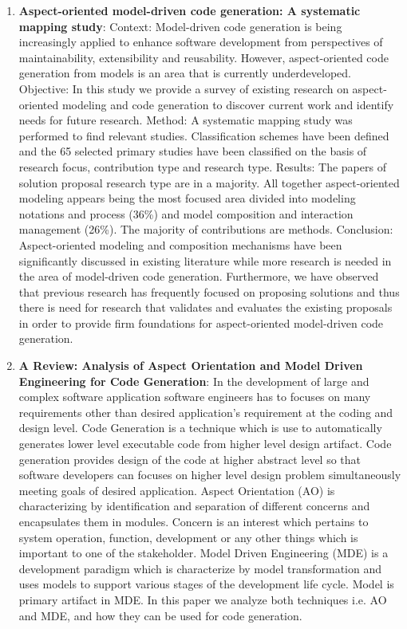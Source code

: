 \begin{englishtext}
\begin{enumerate}
    \item \textbf{Aspect-oriented model-driven code generation: A systematic
    mapping study}: Context: Model-driven code generation is being increasingly
    applied to enhance software development from perspectives of
    maintainability, extensibility and reusability. However, aspect-oriented
    code generation from models is an area that is currently underdeveloped.
    Objective: In this study we provide a survey of existing research on
    aspect-oriented modeling and code generation to discover current work and
    identify needs for future research. Method: A systematic mapping study was
    performed to find relevant studies. Classification schemes have been defined
    and the 65 selected primary studies have been classified on the basis of
    research focus, contribution type and research type. Results: The papers of
    solution proposal research type are in a majority. All together
    aspect-oriented modeling appears being the most focused area divided into
    modeling notations and process (36\%) and model composition and interaction
    management (26\%). The majority of contributions are methods. Conclusion:
    Aspect-oriented modeling and composition mechanisms have been significantly
    discussed in existing literature while more research is needed in the area
    of model-driven code generation. Furthermore, we have observed that previous
    research has frequently focused on proposing solutions and thus there is
    need for research that validates and evaluates the existing proposals in
    order to provide firm foundations for aspect-oriented model-driven code
    generation. \cite{aspectOriented}

    \item \textbf{A Review: Analysis of Aspect Orientation and Model Driven
    Engineering for Code Generation}: In the development of large and complex
    software application software engineers has to focuses on many requirements
    other than desired application’s requirement at the coding and design level.
    Code Generation is a technique which is use to automatically generates lower
    level executable code from higher level design artifact. Code generation
    provides design of the code at higher abstract level so that software
    developers can focuses on higher level design problem simultaneously meeting
    goals of desired application. Aspect Orientation (AO) is characterizing by
    identification and separation of different concerns and encapsulates them in
    modules. Concern is an interest which pertains to system operation,
    function, development or any other things which is important to one of the
    stakeholder. Model Driven Engineering (MDE) is a development paradigm which
    is characterize by model transformation and uses models to support various
    stages of the development life cycle. Model is primary artifact in MDE. In
    this paper we analyze both techniques i.e. AO and MDE, and how they can be
    used for code generation. \cite{aspectOrientationReview}

\end{enumerate}
\end{englishtext}


